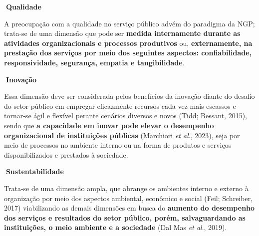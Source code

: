 \documentclass[
  letterpaper,
  DIV=11,
  numbers=noendperiod]{scrreprt}
\begin{document}
\begin{tcolorbox}[enhanced jigsaw, opacityback=0, toprule=.15mm, breakable, leftrule=.75mm, rightrule=.15mm, left=2mm, colback=white, arc=.35mm, bottomrule=.15mm]

\textbf{🔽{Qualidade}}\vspace{2mm}

A preocupação com a qualidade no serviço público advém do paradigma da
NGP; trata-se de uma dimensão que pode ser \textbf{medida internamente
durante as atividades organizacionais e processos produtivos} ou,
\textbf{externamente, na prestação dos serviços por meio dos seguintes
aspectos: confiabilidade, responsividade, segurança, empatia e
tangibilidade}.

\end{tcolorbox}

\begin{tcolorbox}[enhanced jigsaw, opacityback=0, toprule=.15mm, breakable, leftrule=.75mm, rightrule=.15mm, left=2mm, colback=white, arc=.35mm, bottomrule=.15mm]

\textbf{🔽{Inovação}}\vspace{2mm}

Essa dimensão deve ser considerada pelos benefícios da inovação diante
do desafio do setor público em empregar eficazmente recursos cada vez
mais escassos e tornar-se ágil e flexível perante cenários diversos e
novos (Tidd; Bessant, 2015), sendo que \textbf{a capacidade em inovar
pode elevar o desempenho organizacional de instituições públicas}
(Marchiori \emph{et al}., 2023), seja por meio de processos no ambiente
interno ou na forma de produtos e serviços disponibilizados e prestados
à sociedade.

\end{tcolorbox}

\begin{tcolorbox}[enhanced jigsaw, opacityback=0, toprule=.15mm, breakable, leftrule=.75mm, rightrule=.15mm, left=2mm, colback=white, arc=.35mm, bottomrule=.15mm]

\textbf{🔽{Sustentabilidade}}\vspace{2mm}

Trata-se de uma dimensão ampla, que abrange os ambientes interno e
externo à organização por meio dos aspectos ambiental, econômico e
social (Feil; Schreiber, 2017) viabilizando as demais dimensões em busca
do \textbf{aumento do desempenho dos serviços e resultados do setor
público, porém, salvaguardando as instituições, o meio ambiente e a
sociedade} (Dal Mas \emph{et al}., 2019).

\end{tcolorbox}
\end{document}
